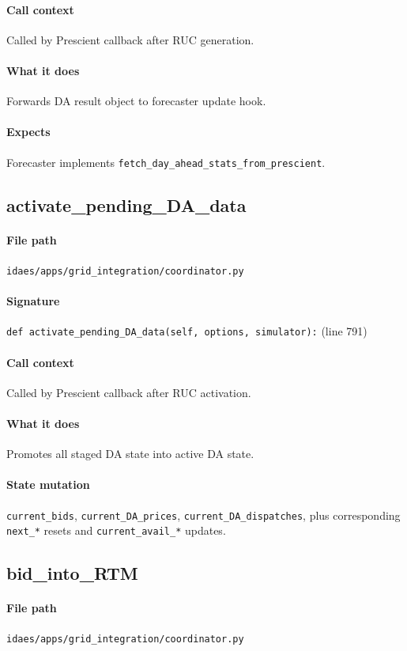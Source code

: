 \documentclass{article}
\begin{document}
\paragraph{Call context} Called by Prescient callback after RUC generation.
\paragraph{What it does} Forwards DA result object to forecaster update hook.
\paragraph{Expects} Forecaster implements \texttt{fetch\_day\_ahead\_stats\_from\_prescient}.

\subsection{activate\_pending\_DA\_data}\label{fn:activate_pending_DA_data}
\paragraph{File path} \texttt{idaes/apps/grid\_integration/coordinator.py}
\paragraph{Signature} \texttt{def activate\_pending\_DA\_data(self, options, simulator):} (line 791)
\paragraph{Call context} Called by Prescient callback after RUC activation.
\paragraph{What it does} Promotes all staged DA state into active DA state.
\paragraph{State mutation} \texttt{current\_bids}, \texttt{current\_DA\_prices}, \texttt{current\_DA\_dispatches}, plus corresponding \texttt{next\_*} resets and \texttt{current\_avail\_*} updates.

\subsection{bid\_into\_RTM}\label{fn:bid_into_RTM}
\paragraph{File path} \texttt{idaes/apps/grid\_integration/coordinator.py}
\end{document}
